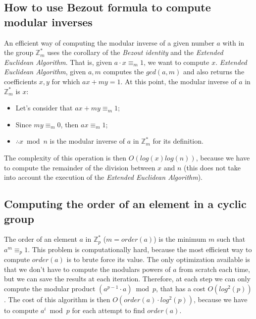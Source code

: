 \documentclass[12pt, a4paper, english]{report}
\begin{document}
\subsection{How to use Bezout formula to compute modular inverses}
An efficient way of computing the modular inverse of a given number $a$ with in the group $\mathbb{Z}_{m}^{*}$ uses the corollary of the \emph{Bezout identity} and the \emph{Extended Euclidean Algorithm}.\newline
That is, given $a \cdot x \equiv_{m} 1$, we want to compute $x$.\newline
\emph{Extended Euclidean Algorithm}, given $a, m$ computes the $gcd(a,m)$ and also returns the coefficients $x,y$ for which $ax + my = 1$. \newline
At this point, the modular inverse of $a$ in $\mathbb{Z}_{m}^{*}$ is $x$:
\begin{itemize}
    \item Let's consider that $ax + my \equiv_{m} 1$;
    \item Since $my \equiv_{m} 0$, then $ax \equiv_{m} 1$;
    \item $\therefore x \bmod n$ is the modular inverse of $a$ in $\mathbb{Z}_{m}^{*}$ for its definition.
\end{itemize}
The complexity of this operation is then $O(log(x)log(n))$, because we have to compute the remainder of the division between $x$ and $n$ (this does not take into account the execution of the \emph{Extended Euclidean Algorithm}).

\subsection{Computing the order of an element in a cyclic group}
The order of an element $a$ in $\mathbb{Z}_{p}^{*}$ ($m = order(a)$) is the minimum $m$ such that $a^{m} \equiv_{p} 1$.\newline
This problem is computationally hard, because the most efficient way to compute $order(a)$ is to brute force its value.\newline
The only optimization available is that we don't have to compute the modulars powers of $a$ from scratch each time, but we can save the results at each iteration. Therefore, at each step we can only compute the modular product $(a^{p-1} \cdot a) \bmod p$, that has a cost $O(log^{2}(p))$.
The cost of this algorithm is then $O(order(a) \cdot log^{2}(p))$, because we have to compute $a^{i} \bmod p$ for each attempt to find $order(a)$.
\end{document}
